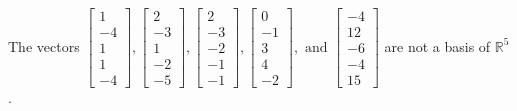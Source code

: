 \begin{exercise}
\begin{exerciseStatement}
  \end{exerciseStatement}
  \begin{exerciseAnswer}
   The vectors \(\left[\begin{array}{r}
1 \\
-4 \\
1 \\
1 \\
-4
\end{array}\right] , \left[\begin{array}{r}
2 \\
-3 \\
1 \\
-2 \\
-5
\end{array}\right] , \left[\begin{array}{r}
2 \\
-3 \\
-2 \\
-1 \\
-1
\end{array}\right] , \left[\begin{array}{r}
0 \\
-1 \\
3 \\
4 \\
-2
\end{array}\right] , \text{ and } \left[\begin{array}{r}
-4 \\
12 \\
-6 \\
-4 \\
15
\end{array}\right]\) 
  	 are not  a basis of \(\mathbb{R}^5\).
  


  \end{exerciseAnswer}
\end{exercise}